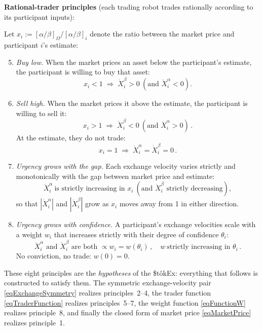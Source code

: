 \documentclass[letterpaper]{article}
\newcommand{\priceAB}{\left[\alpha / \beta\right]}
\newcommand{\StokEx}{\$t\^{o}kEx}
\begin{document}
\textbf{Rational-trader principles} (each trading robot trades rationally according to its participant inputs):

Let $x_i := \priceAB_\Omega / \priceAB_i$ denote the ratio between the market price and participant $i$'s estimate:
\begin{enumerate}
    \setcounter{enumi}{4}
    \item \emph{Buy low.} When the market prices an asset below the participant's estimate, the participant is willing to buy that asset:
    \begin{equation*}
        x_i < 1 \;\Longrightarrow\; \dot{X}_i^\beta > 0 \ \left(\text{and } \dot{X}_i^\alpha < 0\right).
    \end{equation*}
    \item \emph{Sell high.} When the market prices it above the estimate, the participant is willing to sell it:
    \begin{equation*}
        x_i > 1 \;\Longrightarrow\; \dot{X}_i^\beta < 0 \ \left(\text{and } \dot{X}_i^\alpha > 0\right)\,.
    \end{equation*}
    At the estimate, they do not trade:
    \begin{equation*}
        x_i = 1 \;\Longrightarrow\; \dot{X}_i^\alpha = \dot{X}_i^\beta = 0\,.
    \end{equation*}
    \item \emph{Urgency grows with the gap.} Each exchange velocity varies strictly and monotonically with the gap between market price and estimate:
    \begin{equation*}
        \dot{X}_i^\alpha \ \text{is strictly increasing in } x_i \ \left(\text{and } \dot{X}_i^\beta \text{ strictly decreasing}\right),
    \end{equation*}
    so that $|\dot{X}_i^\alpha|$ and $|\dot{X}_i^\beta|$ grow as $x_i$ moves away from 1 in either direction.
    \item \emph{Urgency grows with confidence.} A participant's exchange velocities scale with a weight $w_i$ that increases strictly with their degree of confidence $\theta_i$:
    \begin{equation*}
        \dot{X}_i^\alpha\text{ and }\dot{X}_i^\beta\text{ are both }\propto w_i = w(\theta_i)\,, \quad w \ \text{strictly increasing in } \theta_i\,.
    \end{equation*}
    No conviction, no trade: $w(0) = 0$.
\end{enumerate}

These eight principles are the \emph{hypotheses} of the \StokEx{}: everything that follows is constructed to satisfy them. The symmetric exchange-velocity pair \eqref{eqExchangeSymmetry} realizes principles~2--4, the trader function \eqref{eqTraderFunction} realizes principles~5--7, the weight function \eqref{eqFunctionW} realizes principle~8, and finally the closed form of market price \eqref{eqMarketPrice} realizes principle~1.
\end{document}
